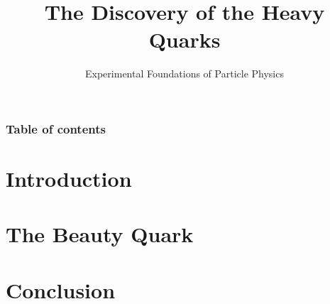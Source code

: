 \documentclass[9pt, xcolor=dvipsnames]{beamer}
\title[Heavy Quarks]{The Discovery of the Heavy Quarks}
\subtitle{Experimental Foundations of Particle Physics}
\begin{document}


\begin{frame}%
	\frametitle{Table of contents}
	\tableofcontents[hideallsubsections]   %
\end{frame}

\section{Introduction}


\section{The Beauty Quark}



\section{Conclusion}


\end{document}
